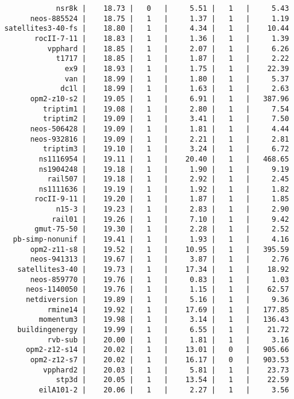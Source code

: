 \begin{lstlisting}
             nsr8k |    18.73 |   0   |     5.51 |   1   |     5.43
       neos-885524 |    18.75 |   1   |     1.37 |   1   |     1.19
 satellites3-40-fs |    18.80 |   1   |     4.34 |   1   |    10.44
        rocII-7-11 |    18.83 |   1   |     1.36 |   1   |     1.39
           vpphard |    18.85 |   1   |     2.07 |   1   |     6.26
             t1717 |    18.85 |   1   |     1.87 |   1   |     2.22
               ex9 |    18.93 |   1   |     1.75 |   1   |    22.39
               van |    18.99 |   1   |     1.80 |   1   |     5.37
              dc1l |    18.99 |   1   |     1.63 |   1   |     2.63
       opm2-z10-s2 |    19.05 |   1   |     6.91 |   1   |   387.96
          triptim1 |    19.08 |   1   |     2.80 |   1   |     7.54
          triptim2 |    19.09 |   1   |     3.41 |   1   |     7.50
       neos-506428 |    19.09 |   1   |     1.81 |   1   |     4.44
       neos-932816 |    19.09 |   1   |     2.21 |   1   |     2.81
          triptim3 |    19.10 |   1   |     3.24 |   1   |     6.72
         ns1116954 |    19.11 |   1   |    20.40 |   1   |   468.65
         ns1904248 |    19.18 |   1   |     1.90 |   1   |     9.19
           rail507 |    19.18 |   1   |     2.92 |   1   |     2.45
         ns1111636 |    19.19 |   1   |     1.92 |   1   |     1.82
        rocII-9-11 |    19.20 |   1   |     1.87 |   1   |     1.85
             n15-3 |    19.23 |   1   |     2.83 |   1   |     2.90
            rail01 |    19.26 |   1   |     7.10 |   1   |     9.42
        gmut-75-50 |    19.30 |   1   |     2.28 |   1   |     2.52
   pb-simp-nonunif |    19.41 |   1   |     1.93 |   1   |     4.16
       opm2-z11-s8 |    19.52 |   1   |    10.95 |   1   |   395.59
       neos-941313 |    19.67 |   1   |     3.87 |   1   |     2.76
    satellites3-40 |    19.73 |   1   |    17.34 |   1   |    18.92
       neos-859770 |    19.76 |   1   |     0.83 |   1   |     1.03
      neos-1140050 |    19.76 |   1   |     1.15 |   1   |    62.57
      netdiversion |    19.89 |   1   |     5.16 |   1   |     9.36
           rmine14 |    19.92 |   1   |    17.69 |   1   |   177.85
         momentum3 |    19.98 |   1   |     3.14 |   1   |   136.43
    buildingenergy |    19.99 |   1   |     6.55 |   1   |    21.72
           rvb-sub |    20.00 |   1   |     1.81 |   1   |     3.16
      opm2-z12-s14 |    20.02 |   1   |    13.01 |   0   |   905.66
       opm2-z12-s7 |    20.02 |   1   |    16.17 |   0   |   903.53
          vpphard2 |    20.03 |   1   |     5.81 |   1   |    23.73
             stp3d |    20.05 |   1   |    13.54 |   1   |    22.59
         eilA101-2 |    20.06 |   1   |     2.27 |   1   |     3.56

\end{lstlisting}
